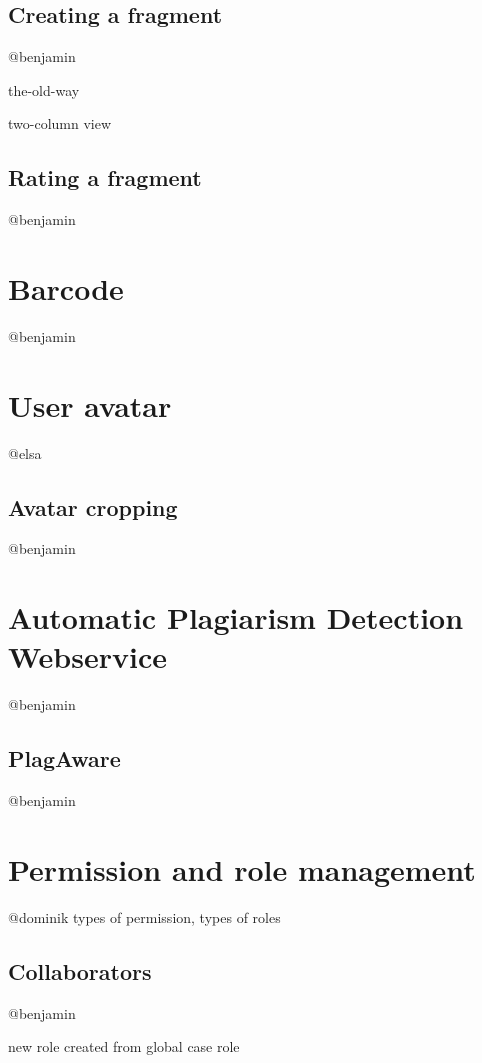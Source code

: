 \subsection{Creating a fragment}
@benjamin

the-old-way

two-column view

\subsection{Rating a fragment}
@benjamin

\section{Barcode}
@benjamin

\section{User avatar}
@elsa

\subsection{Avatar cropping}
@benjamin

\section{Automatic Plagiarism Detection Webservice}
@benjamin
\subsection{PlagAware}
@benjamin

\section{Permission and role management}
@dominik
types of permission, types of roles

\subsection{Collaborators}
@benjamin

new role created from global case role